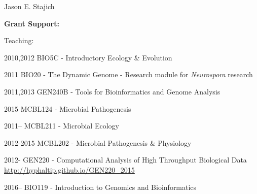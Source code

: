 \documentclass[10pt]{article}
\begin{document}
\begin{cv}{\centerline{Jason E. Stajich}}
\begin{cvlistcompact}{\bf Grant Support:}
\begin{cvlistcompact}{Teaching:}
\item [2010,2012] BIO5C - Introductory Ecology \& Evolution 
\item [2011] BIO20 - The Dynamic Genome - Research module for \textit{Neurospora} research
\item [2011,2013] GEN240B - Tools for Bioinformatics and Genome Analysis
\item [2015] MCBL124 - Microbial Pathogenesis
\item [2011--] MCBL211 - Microbial Ecology
\item [2012-2015] MCBL202 - Microbial Pathogenesis \& Physiology
\item [2012-] GEN220 - Computational Analysis of High Throughput Biological Data \url{http://hyphaltip.github.io/GEN220_2015}
\item [2016--] BIO119 - Introduction to Genomics and Bioinformatics

\end{cvlistcompact}


\end{cvlistcompact}
\end{cv}
\end{document}
